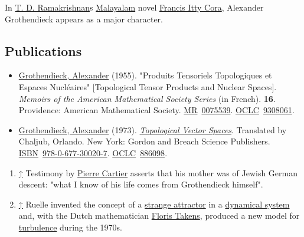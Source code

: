 In \href{https://en.wikipedia.org/wiki/T._D._Ramakrishnan}{T. D. Ramakrishnan}\textquotesingle s \href{https://en.wikipedia.org/wiki/Malayalam}{Malayalam} novel \href{https://en.wikipedia.org/wiki/Francis_Itty_Cora}{Francis Itty Cora}, Alexander Grothendieck appears as a major character.


\subsection{Publications}\label{Publications}

\begin{itemize}
\tightlist
\item
  {\href{https://en.wikipedia.org/wiki/Alexander_Grothendieck}{Grothendieck, Alexander} (1955). "Produits Tensoriels Topologiques et Espaces Nucléaires" {{[}}Topological Tensor Products and Nuclear Spaces{{]}}. \emph{Memoirs of the American Mathematical Society Series} (in French). \textbf{16}. Providence: American Mathematical Society. \href{https://en.wikipedia.org/wiki/MR_(identifier)}{MR}{~}\href{https://mathscinet.ams.org/mathscinet-getitem?mr=0075539}{0075539}. \href{https://en.wikipedia.org/wiki/OCLC_(identifier)}{OCLC}{~}\href{https://search.worldcat.org/oclc/9308061}{9308061}.{}}
\item
  {\href{https://en.wikipedia.org/wiki/Alexander_Grothendieck}{Grothendieck, Alexander} (1973). {\href{https://archive.org/details/topologicalvecto0000grot}{\emph{Topological Vector Spaces}}}. Translated by Chaljub, Orlando. New York: Gordon and Breach Science Publishers. \href{https://en.wikipedia.org/wiki/ISBN_(identifier)}{ISBN}{~}\href{https://en.wikipedia.org/wiki/Special:BookSources/978-0-677-30020-7}{978-0-677-30020-7}. \href{https://en.wikipedia.org/wiki/OCLC_(identifier)}{OCLC}{~}\href{https://search.worldcat.org/oclc/886098}{886098}.{}}
\end{itemize}






\begin{enumerate}
\tightlist
\item
  {{\href{https://en.wikipedia.org/wiki/Alexander_Grothendieck\#cite_ref-16}{{↑}}} {Testimony by \href{https://en.wikipedia.org/wiki/Pierre_Cartier_(mathematician)}{Pierre Cartier} asserts that his mother was of Jewish German descent: "what I know of his life comes from Grothendieck himself".}}
\item
  {{\href{https://en.wikipedia.org/wiki/Alexander_Grothendieck\#cite_ref-50}{{↑}}} {Ruelle invented the concept of a \href{https://en.wikipedia.org/wiki/Strange_attractor}{strange attractor} in a \href{https://en.wikipedia.org/wiki/Dynamical_system}{dynamical system} and, with the Dutch mathematician \href{https://en.wikipedia.org/wiki/Floris_Takens}{Floris Takens}, produced a new model for \href{https://en.wikipedia.org/wiki/Turbulence}{turbulence} during the 1970s.}}
\end{enumerate}




